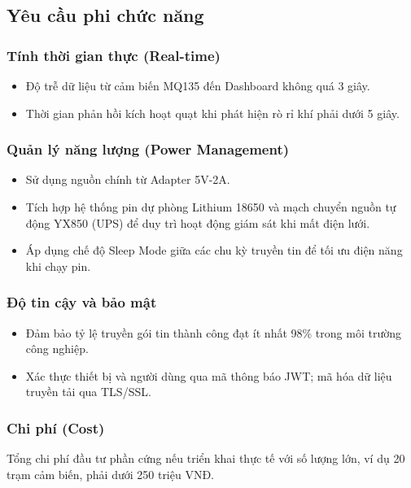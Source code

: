 \documentclass[../BTL_PTIT.tex]{subfiles}
\begin{document}
\subsection{Yêu cầu phi chức năng}

\subsubsection{Tính thời gian thực (Real-time)}
\begin{itemize}
    \item Độ trễ dữ liệu từ cảm biến MQ135 đến Dashboard không quá 3 giây.
    \item Thời gian phản hồi kích hoạt quạt khi phát hiện rò rỉ khí phải dưới 5 giây.
\end{itemize}

\subsubsection{Quản lý năng lượng (Power Management)}
\begin{itemize}
    \item Sử dụng nguồn chính từ Adapter 5V-2A.
    \item Tích hợp hệ thống pin dự phòng Lithium 18650 và mạch chuyển nguồn tự động YX850 (UPS) để duy trì hoạt động giám sát khi mất điện lưới.
    \item Áp dụng chế độ Sleep Mode giữa các chu kỳ truyền tin để tối ưu điện năng khi chạy pin.
\end{itemize}

\subsubsection{Độ tin cậy và bảo mật}
\begin{itemize}[label=\textbullet]
    \item Đảm bảo tỷ lệ truyền gói tin thành công đạt ít nhất 98\% trong môi trường công nghiệp.
    \item Xác thực thiết bị và người dùng qua mã thông báo JWT; mã hóa dữ liệu truyền tải qua TLS/SSL.
\end{itemize}

\subsubsection{Chi phí (Cost)}
Tổng chi phí đầu tư phần cứng nếu triển khai thực tế với số lượng lớn, ví dụ 20 trạm cảm biến, phải dưới 250 triệu VNĐ.
\end{document}
